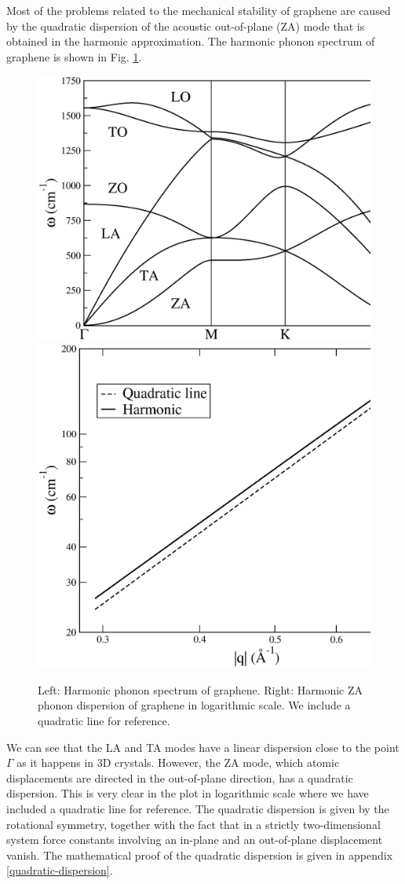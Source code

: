Most of the problems related to the mechanical stability of graphene are caused by the quadratic dispersion of the 
acoustic out-of-plane (ZA) mode that is obtained in the harmonic approximation. The harmonic phonon spectrum of 
graphene is shown in Fig. \ref{harmonic-graphene}.
\begin{figure}[h]
\includegraphics[width=0.55\linewidth]{Figures/harmonic-graphene.eps}
\includegraphics[width=0.45\linewidth]{Figures/harmonic-graphene-logarithmic.eps}
\caption[Graphene harmonic phonons]{Left: Harmonic phonon spectrum of graphene. Right: Harmonic ZA phonon dispersion 
	of graphene in logarithmic scale. We include a quadratic line for reference.}
\label{harmonic-graphene}
\end{figure}
We can see that the LA and TA modes have a linear dispersion close to the point $\Gamma$ as it happens in 3D 
crystals. However, the ZA mode, which atomic displacements are directed in the out-of-plane direction, has a 
quadratic dispersion. This is very clear in the plot in logarithmic scale where we have included a quadratic line for 
reference. The quadratic dispersion is given by the rotational symmetry, together with the fact that in a strictly 
two-dimensional system force constants involving an in-plane and an out-of-plane displacement 
vanish\cite{katsnelson2013graphene}. The mathematical proof of the quadratic dispersion is given in 
appendix \ref{quadratic-dispersion}. \\

